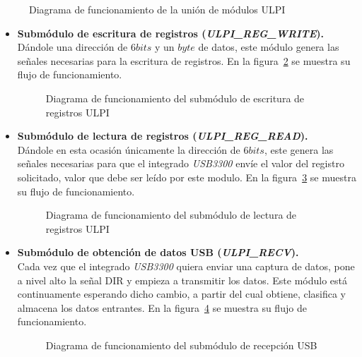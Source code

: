 \begin{figure}[!hbt]
    \centering
    \scalebox{0.8} {}
    \caption{Diagrama de funcionamiento de la unión de módulos ULPI}
    \label{fig:flujo_ulpi_main}
\end{figure}

\begin{itemize}
    \item \textbf{Submódulo de escritura de registros (\emph{ULPI\_REG\_WRITE}).} \\
    Dándole una dirección de $6bits$ y un $byte$ de datos, este módulo genera las señales necesarias para la escritura de registros. En la figura~\ref{fig:flujo_ulpi_write} se muestra su flujo de funcionamiento.
    \begin{figure}[!hbt]
        \centering
        \scalebox{0.8} {}
        \caption{Diagrama de funcionamiento del submódulo de escritura de registros ULPI}
        \label{fig:flujo_ulpi_write}
    \end{figure}
    
    \item \textbf{Submódulo de lectura de registros (\emph{ULPI\_REG\_READ}).} \\
    Dándole en esta ocasión únicamente la dirección de $6bits$, este genera las señales necesarias para que el integrado \emph{USB3300} envíe el valor del registro solicitado, valor que debe ser leído por este modulo. En la figura~\ref{fig:flujo_ulpi_read} se muestra su flujo de funcionamiento.
    \begin{figure}[!hbt]
        \centering
        \scalebox{0.8} {}
        \caption{Diagrama de funcionamiento del submódulo de lectura de registros ULPI}
        \label{fig:flujo_ulpi_read}
    \end{figure}
    
    \item \textbf{Submódulo de obtención de datos USB (\emph{ULPI\_RECV}).} \\
    Cada vez que el integrado \emph{USB3300} quiera enviar una captura de datos, pone a nivel alto la señal DIR y empieza a transmitir los datos. Este módulo está continuamente esperando dicho cambio, a partir del cual obtiene, clasifica y almacena los datos entrantes. En la figura~\ref{fig:flujo_ulpi_recv} se muestra su flujo de funcionamiento.
    \begin{figure}[!hbt]
        \centering
        \scalebox{0.8} {}
        \caption{Diagrama de funcionamiento del submódulo de recepción USB}
        \label{fig:flujo_ulpi_recv}
    \end{figure}
\end{itemize}


